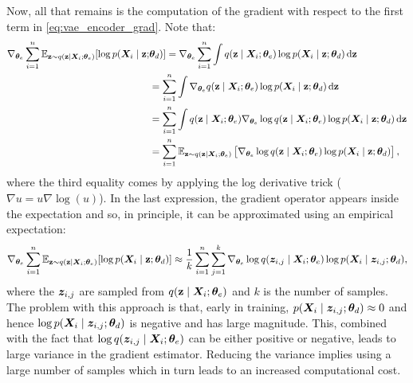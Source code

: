 Now, all that remains is the computation of the gradient with respect to the first term in \eqref{eq:vae_encoder_grad}. Note that:
\begingroup
\allowdisplaybreaks
\begin{align}
    \nabla_{{\bm{\theta}}_e} \sum_{i=1}^n \mathbb{E}_{{\mathbf{z}} \sim q({\mathbf{z}} \mid {\bm{X}}_i; {\bm{\theta}}_e)} [\log p({\bm{X}}_i \mid {\mathbf{z}}; &{\bm{\theta}}_d) ] = \nabla_{{\bm{\theta}}_e} \sum_{i=1}^n \int q({\mathbf{z}} \mid {\bm{X}}_i; {\bm{\theta}}_e) \log p({\bm{X}}_i \mid {\mathbf{z}}; {\bm{\theta}}_d) {\,\text{d}} {\mathbf{z}} \nonumber\\
    &= \sum_{i=1}^n \int \nabla_{{\bm{\theta}}_e} q({\mathbf{z}} \mid {\bm{X}}_i; {\bm{\theta}}_e) \log p({\bm{X}}_i \mid {\mathbf{z}}; {\bm{\theta}}_d) {\,\text{d}} {\mathbf{z}} \nonumber\\
    &= \sum_{i=1}^n \int q({\mathbf{z}} \mid {\bm{X}}_i; {\bm{\theta}}_e) \nabla_{{\bm{\theta}}_e} \log q({\mathbf{z}} \mid {\bm{X}}_i; {\bm{\theta}}_e) \log p({\bm{X}}_i \mid {\mathbf{z}}; {\bm{\theta}}_d) {\,\text{d}} {\mathbf{z}} \nonumber\\
    &= \sum_{i=1}^n \mathbb{E}_{{\mathbf{z}} \sim q({\mathbf{z}} \mid {\bm{X}}_i; {\bm{\theta}}_e)} \left[\nabla_{{\bm{\theta}}_e} \log q({\mathbf{z}} \mid {\bm{X}}_i; {\bm{\theta}}_e) \log p({\bm{X}}_i \mid {\mathbf{z}}; {\bm{\theta}}_d)\right],
\end{align}
\endgroup
where the third equality comes by applying the log derivative trick ($\nabla u = u \nabla \log(u)$). In the last expression, the gradient operator appears inside the expectation and so, in principle, it can be approximated using an empirical expectation:
\begin{equation}
    \nabla_{{\bm{\theta}}_e} \sum_{i=1}^n \mathbb{E}_{{\mathbf{z}} \sim q({\mathbf{z}} \mid {\bm{X}}_i; {\bm{\theta}}_e)} [\log p({\bm{X}}_i \mid {\mathbf{z}}; {\bm{\theta}}_d) ] \approx \frac{1}{k} \sum_{i=1}^n \sum_{j=1}^k \nabla_{{\bm{\theta}}_e} \log q({\bm{z}}_{i,j} \mid {\bm{X}}_i; {\bm{\theta}}_e) \log p({\bm{X}}_i \mid {\bm{z}}_{i,j}; {\bm{\theta}}_d),
\end{equation}
where the ${\bm{z}}_{i,j}$ are sampled from $q({\mathbf{z}} \mid {\bm{X}}_i; {\bm{\theta}}_e)$ and $k$ is the number of samples. The problem with this approach is that, early in training, $p({\bm{X}}_i \mid {\bm{z}}_{i,j}; {\bm{\theta}}_d) \approx 0$ and hence $\log p({\bm{X}}_i \mid {\bm{z}}_{i,j}; {\bm{\theta}}_d)$ is negative and has large magnitude. This, combined with the fact that $\log q({\bm{z}}_{i,j} \mid {\bm{X}}_i; {\bm{\theta}}_e)$ can be either positive or negative, leads to  large variance in the gradient estimator. Reducing the variance implies using a large number of samples which in turn leads to an increased computational cost.

